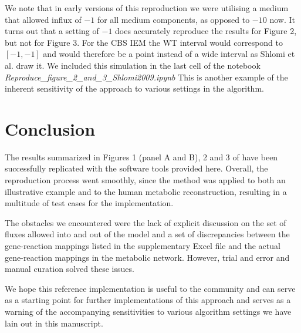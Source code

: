 \documentclass[10pt,a4paper,onecolumn]{article}
\begin{document}
We note that in early versions of this reproduction we were utilising a
medium that allowed influx of \(-1\) for all medium components, as
opposed to \(-10\) now. It turns out that a setting of \(-1\) does
accurately reproduce the results for Figure 2, but not for Figure 3. For
the CBS IEM the WT interval would correspond to \([-1,-1]\) and would
therefore be a point instead of a wide interval as Shlomi et al. draw
it. We included this simulation in the last cell of the notebook
\emph{Reproduce\_figure\_2\_and\_3\_Shlomi2009.ipynb} This is another
example of the inherent sensitivity of the approach to various settings
in the algorithm.

\section{Conclusion}\label{conclusion}

The results summarized in Figures 1 (panel A and B), 2 and 3 of
\autocite{Shlomi2009} have been successfully replicated with the
software tools provided here. Overall, the reproduction process went
smoothly, since the method was applied to both an illustrative example
and to the human metabolic reconstruction, resulting in a multitude of
test cases for the implementation.

The obstacles we encountered were the lack of explicit discussion on the
set of fluxes allowed into and out of the model and a set of
discrepancies between the gene-reaction mappings listed in the
supplementary Excel file and the actual gene-reaction mappings in the
metabolic network. However, trial and error and manual curation solved
these issues.

We hope this reference implementation is useful to the community and can
serve as a starting point for further implementations of this approach
and serves as a warning of the accompanying sensitivities to various
algorithm settings we have lain out in this manuscript.

{\sffamily \small
  \printbibliography[title=References]
}
\end{document}
